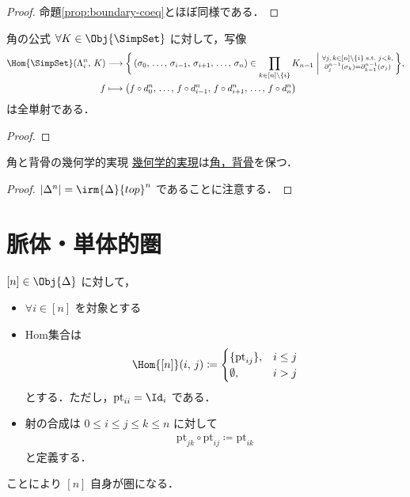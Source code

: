 \documentclass[TQFT_main]{subfiles}
\begin{document}
\begin{proof}
    命題\ref{prop:boundary-coeq}とほぼ同様である．
\end{proof}

\begin{mycol}[label=col:horn-coeq]{角の公式}
    $\forall K \in \Obj{\SimpSet}$ に対して，写像
    \begin{align}
        \Hom{\SimpSet} (\Lambda^n_i,\, K) &\lto \biggl\{\, (\sigma_0,\, \dots,\,\sigma_{i-1},\, \sigma_{i+1},\, \dots,\, \sigma_n) \in \prod_{k \in [n] \setminus \{i\}} K_{n-1} \biggm| \substack{\forall j,\, k \in [n] \setminus \{i\}\; \mathrm{s.t.}\;  j < k,\\  \partial^{n-1}_j (\sigma_k) = \partial^{n-1}_{k-1} (\sigma_j)} \,\biggr\}, \\
        f &\lmto \bigl(f \circ d^n_0,\, \dots,\, f\circ d^n_{i-1},\, f\circ d^n_{i+1},\, \dots,\, f \circ d^n_n \bigr) 
    \end{align}
    は全単射である．
\end{mycol}

\begin{proof}
    
\end{proof}


\begin{myprop}[label=prop:horn-spine-basic]{角と背骨の幾何学的実現}
    \hyperref[def:geometric-realization]{幾何学的実現}は\hyperref[def:horn]{角，背骨}を保つ．
\end{myprop}

\begin{proof}
    $\abs{\Delta^n} = \irm{\Delta}{top}^n$ であることに注意する．
\end{proof}

\section{脈体・単体的圏}

$[n] \in \Obj{\Delta}$ に対して，
\begin{itemize}
    \item $\forall i \in [n]$ を対象とする
    \item Hom集合は
    \begin{align}
        \Hom{[n]} (i,\, j)
        \coloneqq
        \begin{cases}
            \{\mathrm{pt}_{ij}\}, &i \le j \\
            \emptyset, &i > j
        \end{cases}
    \end{align}
    とする．ただし，$\mathrm{pt}_{ii} = \Id_i$ である．
    \item 射の合成は $0 \le i \le j \le k \le n$ に対して
    \begin{align}
        \mathrm{pt}_{jk} \circ \mathrm{pt}_{ij} \coloneqq \mathrm{pt}_{ik}
    \end{align}
    と定義する．
\end{itemize}
ことにより $[n]$ 自身が圏になる．
\end{document}
